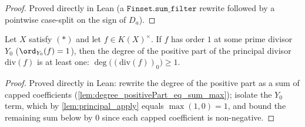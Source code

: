 \begin{proof}
  Proved directly in Lean (a \(\texttt{Finset.sum\_filter}\) rewrite followed
  by a pointwise case-split on the sign of \(D_a\)).
\end{proof}
\begin{lemma}

  \label{lem:one_le_degree_positivePart_principal_of_order_one}
  Let \(X\) satisfy \((*)\) and let \(f \in K(X)^{\times}\). If \(f\) has order
  \(1\) at some prime divisor \(Y_0\) (\(\ord_{Y_0}(f) = 1\)), then the degree
  of the positive part of the principal divisor \(\mathrm{div}(f)\) is at least
  one: \(\deg\bigl((\mathrm{div}(f))_0\bigr) \geq 1\).
\end{lemma}
\begin{proof}
  Proved directly in Lean: rewrite the degree of the positive part as a sum of
  capped coefficients (\ref{lem:degree_positivePart_eq_sum_max}); isolate the
  \(Y_0\) term, which by \ref{lem:principal_apply} equals \(\max(1, 0) = 1\),
  and bound the remaining sum below by \(0\) since each capped coefficient is
  non-negative.
\end{proof}
